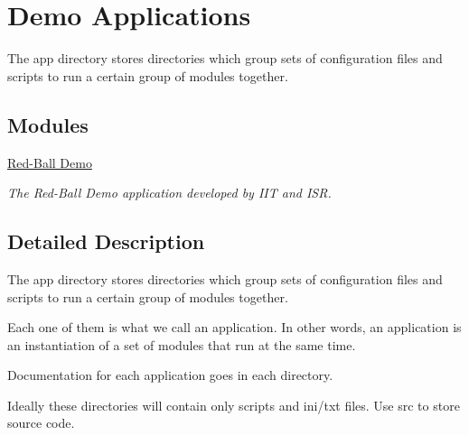\section{Demo Applications}
\label{group__demo__applications}


The app directory stores directories which group sets of configuration files and scripts to run a certain group of modules together.  


\subsection*{Modules}
\begin{DoxyCompactItemize}
\item 
\hyperlink{group__app__demoRedBall}{Red-\/\+Ball Demo}
\begin{DoxyCompactList}\small\item\em The Red-\/\+Ball Demo application developed by I\+IT and I\+SR. \end{DoxyCompactList}\end{DoxyCompactItemize}


\subsection{Detailed Description}
The app directory stores directories which group sets of configuration files and scripts to run a certain group of modules together. 

Each one of them is what we call an application. In other words, an application is an instantiation of a set of modules that run at the same time.

Documentation for each application goes in each directory.

Ideally these directories will contain only scripts and ini/txt files. Use src to store source code. 